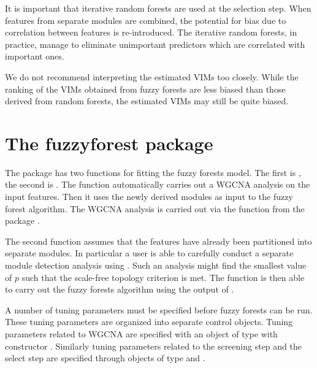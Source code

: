 \documentclass[article,shortnames]{jss}
\begin{document}
It is important that iterative random forests are used at the selection step.  When features from separate modules are combined,
the potential for bias due to correlation between features is re-introduced.  The iterative random forests, in practice, manage to
eliminate unimportant predictors which are correlated with important ones.  

We do not recommend interpreting the estimated VIMs too closely.  While the ranking of the VIMs obtained from
fuzzy forests are less biased than those derived from random forests, the estimated VIMs may still be quite biased.

\section{The fuzzyforest package}
The package   has two functions for fitting the fuzzy forests model.  The first is , the
second is .  The function  automatically carries out a WGCNA analysis on the input features.
Then it uses the newly derived modules as input to the fuzzy forest algorithm.  The WGCNA analysis is carried out via the 
 function from the package .

The second function  assumes that the features have already been partitioned into separate modules.
In particular a user is able to carefully conduct a separate module detection analysis using .  Such an 
analysis might find the smallest value of $p$ such that the scale-free topology criterion is met.  The function 
is then able to carry out the fuzzy forests algorithm using the output of .

A number of tuning parameters must be specified before fuzzy forests can be run.   These tuning parameters are organized
into separate control objects.  Tuning parameters related to WGCNA are specified with an  object of type 
with constructor \newline {}.
Similarly tuning parameters related to the screening step and the select step are specified through objects of type 
 and .  
\end{document}
